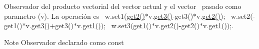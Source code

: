 Observador del producto vectorial del vector actual y el vector~\newline
 pasado como parametro (v). La operación es~\newline
 w.\+set1(\mbox{\hyperlink{classed_1_1Vector3D_acb66f2ac0cb4f24592698fb317458e35}{get2()}}$\ast$v.\mbox{\hyperlink{classed_1_1Vector3D_a50c08e3089bc1b0cd5de77d8f0086cc0}{get3()}}-\/get3()$\ast$v.\mbox{\hyperlink{classed_1_1Vector3D_acb66f2ac0cb4f24592698fb317458e35}{get2()}});~\newline
 w.\+set2(-\/get1()$\ast$v.\mbox{\hyperlink{classed_1_1Vector3D_a50c08e3089bc1b0cd5de77d8f0086cc0}{get3()}}+get3()$\ast$v.\mbox{\hyperlink{classed_1_1Vector3D_ac96497e7c082fde19b4998408e4ec36b}{get1()}});~\newline
 w.\+set3(\mbox{\hyperlink{classed_1_1Vector3D_ac96497e7c082fde19b4998408e4ec36b}{get1()}}$\ast$v.\mbox{\hyperlink{classed_1_1Vector3D_acb66f2ac0cb4f24592698fb317458e35}{get2()}}-\/get2()$\ast$v.\mbox{\hyperlink{classed_1_1Vector3D_ac96497e7c082fde19b4998408e4ec36b}{get1()}});. 

\begin{DoxyNote}{Note}
Observador declarado como const
\end{DoxyNote}


